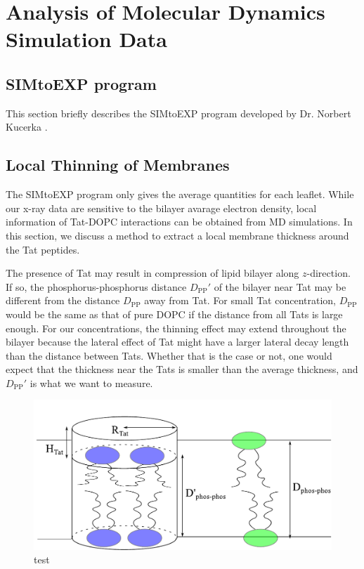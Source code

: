 \newpage
\section{Analysis of Molecular Dynamics Simulation Data}
\subsection{SIMtoEXP program}
This section briefly describes the SIMtoEXP program
developed by Dr. Norbert Kucerka \cite{ref:Kucerka10}. 

\subsection{Local Thinning of Membranes}
The SIMtoEXP program only gives the average quantities for each leaflet. 
While our x-ray data are sensitive to the bilayer avarage electron density,
local information of Tat-DOPC interactions can be obtained from MD simulations.
In this section, we discuss a method to extract a local membrane thickness
around the Tat peptides.

The presence of Tat may result in compression of lipid bilayer along 
$z$-direction. If so, the phosphorus-phosphorus distance $D_\textrm{PP}'$ 
of the bilayer near Tat may be different from the distance
$D_\textrm{PP}$ away from Tat.  
For small Tat concentration, $D_\textrm{PP}$ would be the same as that of 
pure DOPC if the 
distance from all Tats is large enough.  For our concentrations, 
the thinning effect may extend throughout the bilayer because the lateral
effect of Tat might have a larger lateral decay length than the distance 
between Tats. Whether that is the case or not, one would expect that the 
thickness near the Tats is smaller than the average thickness, and
$D_\textrm{PP}'$ is what we want to measure. 
\begin{figure}[htbp]
  \centering
  \includegraphics[scale=0.5]{./figures/Tat/cylinder_model}
  \caption{test}
  \label{fig:cylinder_model}
\end{figure}
 
